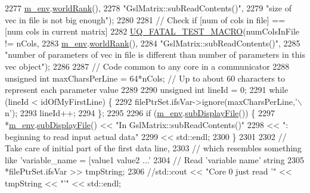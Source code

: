 \begin{DoxyCode}
2277                         \hyperlink{class_q_u_e_s_o_1_1_matrix_a247fb0fc0b87fecdee054bb4660b68e8}{m\_env}.\hyperlink{class_q_u_e_s_o_1_1_base_environment_a78b57112bbd0e6dd0e8afec00b40ffa7}{worldRank}(),
2278                         \textcolor{stringliteral}{"GslMatrix::subReadContents()"},
2279                         \textcolor{stringliteral}{"size of vec in file is not big enough"});
2280 
2281     \textcolor{comment}{// Check if [num of cols in file] == [num cols in current matrix]}
2282     \hyperlink{_defines_8h_a56d63d18d0a6d45757de47fcc06f574d}{UQ\_FATAL\_TEST\_MACRO}(numColsInFile != nCols,
2283                         \hyperlink{class_q_u_e_s_o_1_1_matrix_a247fb0fc0b87fecdee054bb4660b68e8}{m\_env}.\hyperlink{class_q_u_e_s_o_1_1_base_environment_a78b57112bbd0e6dd0e8afec00b40ffa7}{worldRank}(),
2284                         \textcolor{stringliteral}{"GslMatrix::subReadContents()"},
2285                         \textcolor{stringliteral}{"number of parameters of vec in file is different than number of parameters in this
       vec object"});
2286 
2287     \textcolor{comment}{// Code common to any core in a communicator}
2288     \textcolor{keywordtype}{unsigned} \textcolor{keywordtype}{int} maxCharsPerLine = 64*nCols; \textcolor{comment}{// Up to about 60 characters to represent each parameter value}
2289 
2290     \textcolor{keywordtype}{unsigned} \textcolor{keywordtype}{int} lineId = 0;
2291     \textcolor{keywordflow}{while} (lineId < idOfMyFirstLine) \{
2292       filePtrSet.ifsVar->ignore(maxCharsPerLine,\textcolor{charliteral}{'\(\backslash\)n'});
2293       lineId++;
2294     \};
2295 
2296     \textcolor{keywordflow}{if} (\hyperlink{class_q_u_e_s_o_1_1_matrix_a247fb0fc0b87fecdee054bb4660b68e8}{m\_env}.\hyperlink{class_q_u_e_s_o_1_1_base_environment_a8a0064746ae8dddfece4229b9ad374d6}{subDisplayFile}()) \{
2297       *\hyperlink{class_q_u_e_s_o_1_1_matrix_a247fb0fc0b87fecdee054bb4660b68e8}{m\_env}.\hyperlink{class_q_u_e_s_o_1_1_base_environment_a8a0064746ae8dddfece4229b9ad374d6}{subDisplayFile}() << \textcolor{stringliteral}{"In GslMatrix::subReadContents()"}
2298                               << \textcolor{stringliteral}{": beginning to read input actual data"}
2299                               << std::endl;
2300     \}
2301 
2302     \textcolor{comment}{// Take care of initial part of the first data line,}
2303     \textcolor{comment}{// which resembles something like 'variable\_name = [value1 value2 ...'}
2304     \textcolor{comment}{// Read 'variable name' string}
2305     *filePtrSet.ifsVar >> tmpString;
2306     \textcolor{comment}{//std::cout << "Core 0 just read '" << tmpString << "'" << std::endl;}

\end{DoxyCode}

